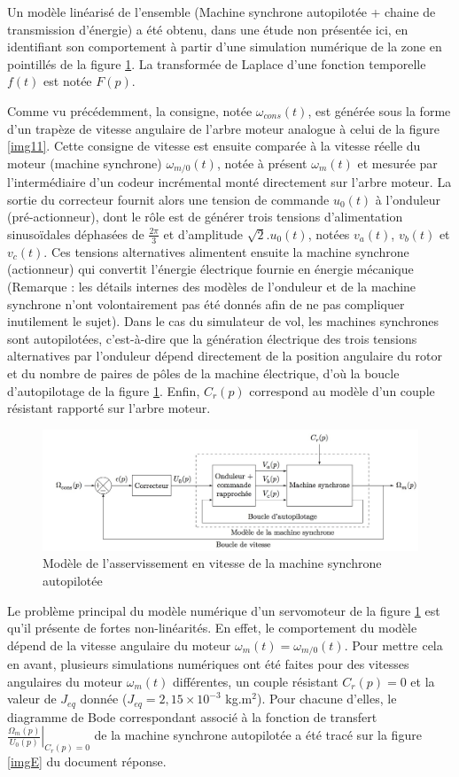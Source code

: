 Un modèle linéarisé de l'ensemble (Machine synchrone autopilotée + chaine de transmission d'énergie) a été obtenu, dans une étude non présentée ici, en identifiant son comportement à partir d'une simulation numérique
de la zone en pointillés de la figure \ref{img15}. La transformée de Laplace d'une fonction temporelle $f(t)$ est notée $F(p)$.

Comme vu précédemment, la consigne, notée $\omega_{cons}(t)$, est générée sous la forme d'un trapèze de vitesse angulaire de l'arbre moteur analogue à celui de la figure \ref{img11}. Cette consigne de vitesse est ensuite comparée à la vitesse réelle du moteur (machine synchrone) $\omega_{m/0}(t)$, notée à présent $\omega_m(t)$ et mesurée par l'intermédiaire d'un codeur incrémental monté directement sur l'arbre moteur. La sortie du correcteur fournit alors une tension de commande $u_0(t)$ à l'onduleur (pré-actionneur), dont le rôle est de générer trois tensions d'alimentation sinusoïdales déphasées de $\frac{2\pi}{3}$ et d'amplitude $\sqrt{2}.u_0(t)$, notées $v_a(t)$, $v_b(t)$ et $v_c(t)$. Ces tensions alternatives alimentent ensuite la machine synchrone (actionneur) qui convertit l'énergie électrique fournie en énergie mécanique (Remarque : les détails internes des modèles de l'onduleur et de la machine synchrone n'ont volontairement pas été donnés afin de ne pas compliquer inutilement le sujet). Dans le cas du simulateur de vol, les machines synchrones sont autopilotées, c'est-à-dire que la génération électrique des trois tensions alternatives par l'onduleur dépend directement de la position angulaire du rotor et du nombre de paires de pôles de la machine électrique, d'où la boucle d'autopilotage de la figure \ref{img15}. Enfin, $C_r(p)$ correspond au modèle d'un couple résistant rapporté sur l'arbre moteur.

\begin{figure}[!h]
 \centering\includegraphics[width=0.7\linewidth]{img/figure_15}
 \caption{Modèle de l'asservissement en vitesse de la machine synchrone autopilotée}
 \label{img15}
\end{figure}

Le problème principal du modèle numérique d'un servomoteur de la figure \ref{img15} est qu'il présente de fortes non-linéarités. En effet, le comportement du modèle dépend de la vitesse angulaire du moteur $\omega_m(t)=\omega_{m/0}(t)$. Pour mettre cela en avant, plusieurs simulations numériques ont été faites pour des vitesses angulaires du moteur $\omega_m(t)$ différentes, un couple résistant $C_r(p)=0$ et la valeur de $J_{eq}$ donnée ($J_{eq}=2,15×10^{-3}$ kg.m$^2$). Pour chacune d'elles, le diagramme de Bode correspondant associé à la fonction de transfert $\left.\frac{\Omega_m(p)}{U_0(p)}\right|_{C_r(p)=0}$ de la machine synchrone autopilotée a été tracé sur la figure \ref{imgE} du document réponse.

